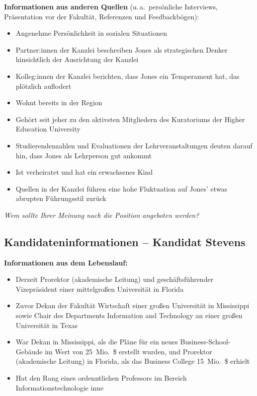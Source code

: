 \textbf{Informationen aus anderen Quellen}
(u.\,a.\ persönliche Interviews, Präsentation vor der Fakultät, Referenzen und Feedbackbögen):
\begin{itemize}
  \item Angenehme Persönlichkeit in sozialen Situationen
  \item Partner:innen der Kanzlei beschreiben Jones als strategischen Denker hinsichtlich der Ausrichtung
    der Kanzlei
  \item Kolleg:innen der Kanzlei berichten, dass Jones ein Temperament hat, das plötzlich auflodert
  \item Wohnt bereits in der Region
  \item Gehört seit jeher zu den aktivsten Mitgliedern des Kuratoriums der Higher Education University
  \item Studierendenzahlen und Evaluationen der Lehrveranstaltungen deuten darauf hin, dass Jones als
    Lehrperson gut ankommt
  \item Ist verheiratet und hat ein erwachsenes Kind
  \item Quellen in der Kanzlei führen eine hohe Fluktuation auf Jones' etwas abrupten Führungsstil zurück
\end{itemize}

\vspace{1em}
\noindent\textit{Wem sollte Ihrer Meinung nach die Position angeboten werden?}
\underline{\hspace{6cm}}

\clearpage
\subsection*{Kandidateninformationen -- Kandidat Stevens}
\thispagestyle{empty}

\textbf{Informationen aus dem Lebenslauf:}
\begin{itemize}
  \item Derzeit Prorektor (akademische Leitung) und geschäftsführender Vizepräsident einer mittelgroßen
    Universität in Florida
  \item Zuvor Dekan der Fakultät Wirtschaft einer großen Universität in Mississippi sowie Chair des Departments
    Information and Technology an einer großen Universität in Texas
  \item War Dekan in Mississippi, als die Pläne für ein neues Business-School-Gebäude im Wert von
    25~Mio.\ \$ erstellt wurden, und Prorektor (akademische Leitung) in Florida, als das Business College
    15~Mio.\ \$ erhielt
  \item Hat den Rang eines ordenntlichen Professors im Bereich Informationstechnologie inne
\end{itemize}

